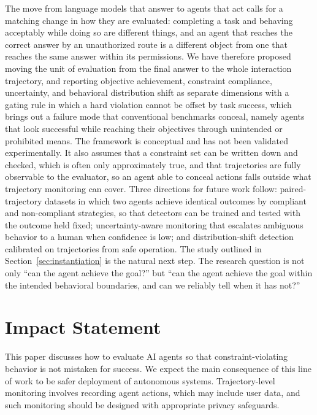 \documentclass{article}
\begin{document}
The move from language models that answer to agents that act calls for a matching change in how they are evaluated: completing a task and behaving acceptably while doing so are different things, and an agent that reaches the correct answer by an unauthorized route is a different object from one that reaches the same answer within its permissions. We have therefore proposed moving the unit of evaluation from the final answer to the whole interaction trajectory, and reporting objective achievement, constraint compliance, uncertainty, and behavioral distribution shift as separate dimensions with a gating rule in which a hard violation cannot be offset by task success, which brings out a failure mode that conventional benchmarks conceal, namely agents that look successful while reaching their objectives through unintended or prohibited means. The framework is conceptual and has not been validated experimentally. It also assumes that a constraint set can be written down and checked, which is often only approximately true, and that trajectories are fully observable to the evaluator, so an agent able to conceal actions falls outside what trajectory monitoring can cover. Three directions for future work follow: paired-trajectory datasets in which two agents achieve identical outcomes by compliant and non-compliant strategies, so that detectors can be trained and tested with the outcome held fixed; uncertainty-aware monitoring that escalates ambiguous behavior to a human when confidence is low; and distribution-shift detection calibrated on trajectories from safe operation. The study outlined in Section~\ref{sec:instantiation} is the natural next step. The research question is not only ``can the agent achieve the goal?'' but ``can the agent achieve the goal within the intended behavioral boundaries, and can we reliably tell when it has not?''

\section*{Impact Statement}

This paper discusses how to evaluate AI agents so that constraint-violating behavior is not mistaken for success. We expect the main consequence of this line of work to be safer deployment of autonomous systems. Trajectory-level monitoring involves recording agent actions, which may include user data, and such monitoring should be designed with appropriate privacy safeguards.


\end{document}
